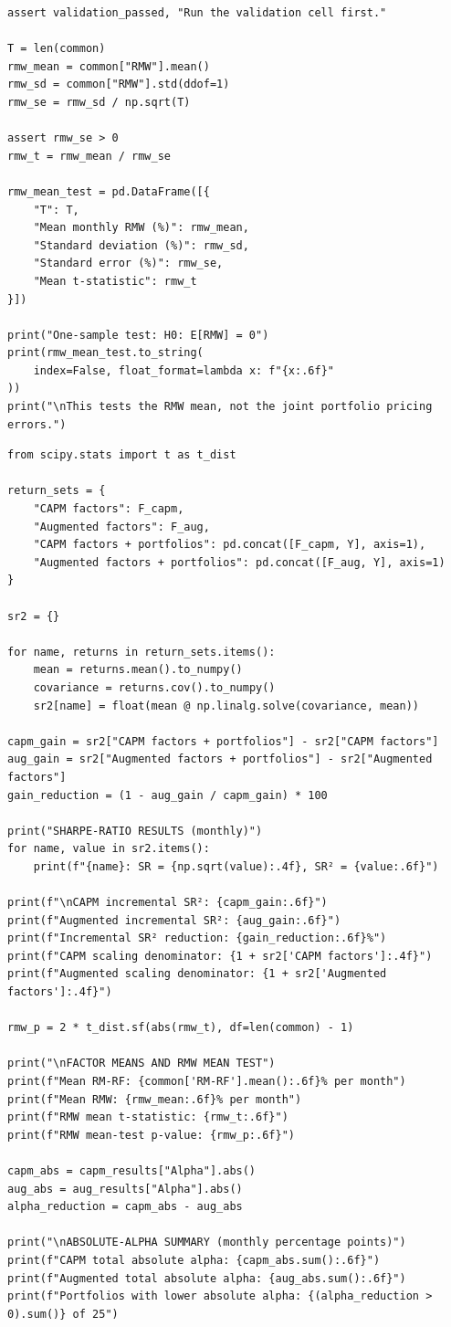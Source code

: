 \documentclass[11pt]{article}
\begin{document}
\begin{lstlisting}
assert validation_passed, "Run the validation cell first."

T = len(common)
rmw_mean = common["RMW"].mean()
rmw_sd = common["RMW"].std(ddof=1)
rmw_se = rmw_sd / np.sqrt(T)

assert rmw_se > 0
rmw_t = rmw_mean / rmw_se

rmw_mean_test = pd.DataFrame([{
    "T": T,
    "Mean monthly RMW (%)": rmw_mean,
    "Standard deviation (%)": rmw_sd,
    "Standard error (%)": rmw_se,
    "Mean t-statistic": rmw_t
}])

print("One-sample test: H0: E[RMW] = 0")
print(rmw_mean_test.to_string(
    index=False, float_format=lambda x: f"{x:.6f}"
))
print("\nThis tests the RMW mean, not the joint portfolio pricing errors.")
\end{lstlisting}
\begin{lstlisting}
from scipy.stats import t as t_dist

return_sets = {
    "CAPM factors": F_capm,
    "Augmented factors": F_aug,
    "CAPM factors + portfolios": pd.concat([F_capm, Y], axis=1),
    "Augmented factors + portfolios": pd.concat([F_aug, Y], axis=1)
}

sr2 = {}

for name, returns in return_sets.items():
    mean = returns.mean().to_numpy()
    covariance = returns.cov().to_numpy()
    sr2[name] = float(mean @ np.linalg.solve(covariance, mean))

capm_gain = sr2["CAPM factors + portfolios"] - sr2["CAPM factors"]
aug_gain = sr2["Augmented factors + portfolios"] - sr2["Augmented factors"]
gain_reduction = (1 - aug_gain / capm_gain) * 100

print("SHARPE-RATIO RESULTS (monthly)")
for name, value in sr2.items():
    print(f"{name}: SR = {np.sqrt(value):.4f}, SR² = {value:.6f}")

print(f"\nCAPM incremental SR²: {capm_gain:.6f}")
print(f"Augmented incremental SR²: {aug_gain:.6f}")
print(f"Incremental SR² reduction: {gain_reduction:.6f}%")
print(f"CAPM scaling denominator: {1 + sr2['CAPM factors']:.4f}")
print(f"Augmented scaling denominator: {1 + sr2['Augmented factors']:.4f}")

rmw_p = 2 * t_dist.sf(abs(rmw_t), df=len(common) - 1)

print("\nFACTOR MEANS AND RMW MEAN TEST")
print(f"Mean RM-RF: {common['RM-RF'].mean():.6f}% per month")
print(f"Mean RMW: {rmw_mean:.6f}% per month")
print(f"RMW mean t-statistic: {rmw_t:.6f}")
print(f"RMW mean-test p-value: {rmw_p:.6f}")

capm_abs = capm_results["Alpha"].abs()
aug_abs = aug_results["Alpha"].abs()
alpha_reduction = capm_abs - aug_abs

print("\nABSOLUTE-ALPHA SUMMARY (monthly percentage points)")
print(f"CAPM total absolute alpha: {capm_abs.sum():.6f}")
print(f"Augmented total absolute alpha: {aug_abs.sum():.6f}")
print(f"Portfolios with lower absolute alpha: {(alpha_reduction > 0).sum()} of 25")
\end{lstlisting}
\end{document}
